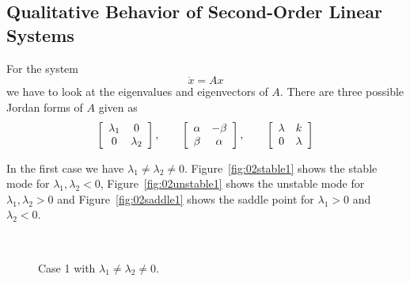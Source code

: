 \subsection{Qualitative Behavior of Second-Order Linear Systems}
For the system
$$\dot{x} = Ax$$
we have to look at the eigenvalues and eigenvectors of $A$. There are three possible Jordan forms of $A$ given as
\begin{align*}
\left[\begin{array}{c c} \lambda_1 & 0 \\ 0 & \lambda_2 \end{array}\right], \qquad
\left[\begin{array}{c c} \alpha & -\beta \\ \beta & \alpha \end{array}\right], \qquad
\left[\begin{array}{c c} \lambda & k \\ 0 & \lambda \end{array}\right]
\end{align*}

In the first case we have $\lambda_1\neq\lambda_2\neq0$. Figure~\ref{fig:02stable1} shows the stable mode for $\lambda_1, \lambda_2<0$, Figure~\ref{fig:02unstable1} shows the unstable mode for $\lambda_1, \lambda_2>0$ and Figure~\ref{fig:02saddle1} shows the saddle point for $\lambda_1>0$ and $\lambda_2<0$.

\begin{figure}[ht!]
\centering
{} \hfill
{} \\
\caption{Case 1 with $\lambda_1\neq\lambda_2\neq0$.}
\label{fig:02case1}
\end{figure}

